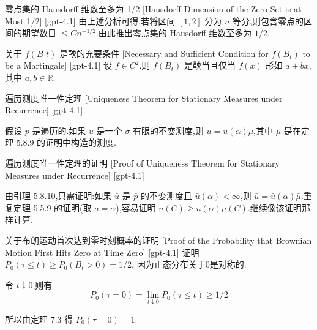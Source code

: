 \documentclass[UTF8]{ctexart}
\begin{document}
    
    
    \begin{crl}
        {零点集的 Hausdorff 维数至多为 1/2}
        [Hausdorff Dimension of the Zero Set is at Most 1/2]
        [gpt-4.1]
        由上述分析可得,若将区间 $[1,2]$ 分为 $n$ 等分,则包含零点的区间的期望数目 $\leq C n^{-1/2}$.由此推出零点集的 Hausdorff 维数至多为 $1/2$.
    \end{crl}
    
    
    
    \begin{thm}
        {关于 $f(B\_t)$ 是鞅的充要条件}
        [Necessary and Sufficient Condition for $f(B_t)$ to be a Martingale]
        [gpt-4.1]
        设 $f \in C^2$.则 $f(B_t)$ 是鞅当且仅当 $f(x)$ 形如 $a + bx$,其中 $a, b \in \mathbb{R}$.
    \end{thm}
    
    
    
    \begin{thm}
        {遍历测度唯一性定理}
        [Uniqueness Theorem for Stationary Measures under Recurrence]
        [gpt-4.1]
        
假设 $p$ 是遍历的.如果 $
u$ 是一个 $\sigma$-有限的不变测度,则 $
u = \bar{
u}(\alpha) \mu$,其中 $\mu$ 是在定理 5.8.9 的证明中构造的测度.

    \end{thm}
    
    
    
    \begin{prf}
        {遍历测度唯一性定理的证明}
        [Proof of Uniqueness Theorem for Stationary Measures under Recurrence]
        [gpt-4.1]
        
由引理 5.8.10,只需证明:如果 $\bar{
u}$ 是 $\bar{p}$ 的不变测度且 $\bar{
u}(\alpha) < \infty$,则 $\bar{
u} = \bar{
u}(\alpha) \bar{\mu}$.重复定理 5.5.9 的证明(取 $a = \alpha$),容易证明 $\bar{
u}(C) \geq \bar{
u}(\alpha) \bar{\mu}(C)$.继续像该证明那样计算.

    \end{prf}
    
    
    
    \begin{prf}
        {关于布朗运动首次达到零时刻概率的证明}
        [Proof of the Probability that Brownian Motion First Hits Zero at Time Zero]
        [gpt-4.1]
        证明 $P_{0} ( \tau \le t ) \ge P_{0} ( B_{t} > 0 ) = 1 / 2$, 因为正态分布关于0是对称的.

令 $t \downarrow 0$,则有
\[
P_{0} ( \tau = 0 ) = \lim_{t \downarrow 0} P_{0} ( \tau \leq t ) \geq 1 / 2
\]

所以由定理 7.3 得 $P_{0} ( \tau = 0 ) = 1$.

    \end{prf}
    
\end{document}
